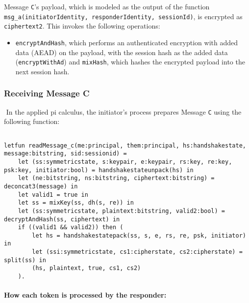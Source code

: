 Message \texttt{C}'s payload, which is modeled as the output of the function \texttt{msg\_a(initiatorIdentity, responderIdentity, sessionId)}, is encrypted as \texttt{ciphertext2}. This invokes the following operations:


\begin{itemize}

\item \texttt{encryptAndHash}, which performs an authenticated encryption with added data (AEAD) on the payload, with the session hash as the added data (\texttt{encryptWithAd}) and \texttt{mixHash}, which hashes the encrypted payload into the next session hash.

\end{itemize}
\subsubsection{Receiving Message C}$ $
In the applied pi calculus, the initiator's process prepares Message \texttt{C} using the following function:


\begin{lstlisting}

letfun readMessage_c(me:principal, them:principal, hs:handshakestate, message:bitstring, sid:sessionid) =
	let (ss:symmetricstate, s:keypair, e:keypair, rs:key, re:key, psk:key, initiator:bool) = handshakestateunpack(hs) in
	let (ne:bitstring, ns:bitstring, ciphertext:bitstring) = deconcat3(message) in
	let valid1 = true in
	let ss = mixKey(ss, dh(s, re)) in
	let (ss:symmetricstate, plaintext:bitstring, valid2:bool) = decryptAndHash(ss, ciphertext) in
	if ((valid1 && valid2)) then (
		let hs = handshakestatepack(ss, s, e, rs, re, psk, initiator) in
		let (ssi:symmetricstate, cs1:cipherstate, cs2:cipherstate) = split(ss) in
		(hs, plaintext, true, cs1, cs2)
	).

\end{lstlisting}

\paragraph{How each token is processed by the responder:}$ $

